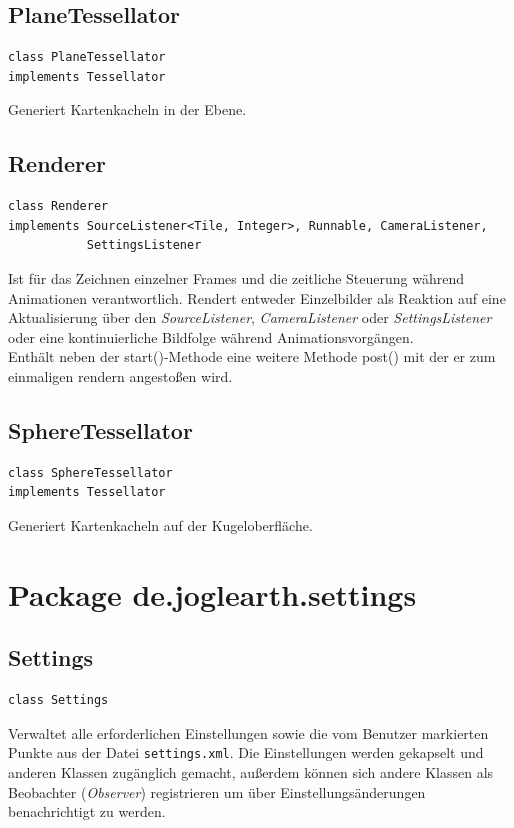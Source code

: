 \documentclass[10pt]{scrreprt}
\begin{document}
\vspace{5mm}
\subsection*{PlaneTessellator}
\begin{lstlisting}
class PlaneTessellator
implements Tessellator
\end{lstlisting}
Generiert Kartenkacheln in der Ebene.\\

\newpage
\vspace{5mm}
\subsection*{Renderer}
\begin{lstlisting}
class Renderer
implements SourceListener<Tile, Integer>, Runnable, CameraListener,
           SettingsListener
\end{lstlisting}
Ist für das Zeichnen einzelner Frames und die zeitliche Steuerung während Animationen verantwortlich. Rendert entweder Einzelbilder als Reaktion auf eine Aktualisierung über den \textit{SourceListener}, \textit{CameraListener} oder \textit{SettingsListener} oder eine kontinuierliche Bildfolge während Animationsvorgängen.\\
Enthält neben der start()-Methode eine weitere Methode post() mit der er zum einmaligen rendern angestoßen wird.\\
\vspace{5mm}
\subsection*{SphereTessellator}
\begin{lstlisting}
class SphereTessellator
implements Tessellator
\end{lstlisting}
Generiert Kartenkacheln auf der Kugeloberfläche.\\




\vspace{5mm}
\section{Package de.joglearth.settings}
\subsection*{Settings}
\begin{lstlisting}
class Settings
\end{lstlisting}
Verwaltet alle erforderlichen Einstellungen sowie die vom Benutzer markierten Punkte aus der Datei \texttt{settings.xml}. Die Einstellungen werden gekapselt und anderen Klassen zugänglich gemacht, außerdem können sich andere Klassen als Beobachter (\textit{Observer}) registrieren um über Einstellungsänderungen benachrichtigt zu werden.\\
\end{document}
